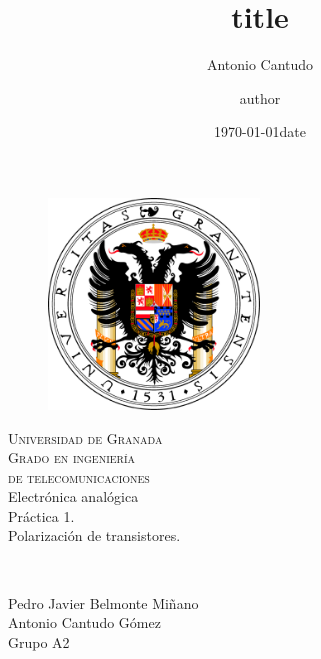 \documentclass[11pt,a4paper]{article}
\author{Antonio Cantudo} %
\date{\today} %
\begin{document}
\title{title}
\author{author}
\date{date}

\begin{titlepage}
  \begin{figure}[t]
    \centering\includegraphics[width=0.5\textwidth]{ugrlogo}
  \end{figure}
  \begin{center}
    \textsc{ \Huge{Universidad de Granada \\}}
    \textsc{ \LARGE{Grado en ingeniería\\de telecomunicaciones\\ }}
    \textnormal{ \LARGE{Electrónica analógica\\}}
    \vspace{30mm}
    \fontsize{20mm}{7mm}\selectfont
    \textup{Práctica 1.\\Polarización de transistores.}\\
  \end{center}

  \vspace{25mm}

  \begin{minipage}[t]{0.47\textwidth}
    \textnormal{\large{\bf \\}}
    {\large }
  \end{minipage}\hfill\begin{minipage}[t]{0.47\textwidth}\raggedleft
    {\Large{Pedro Javier Belmonte Miñano}\\
     \Large{Antonio Cantudo Gómez}\\
     \large{Grupo A2}}
  \end{minipage}

  \vspace{20mm}

\end{titlepage}
\end{document}
